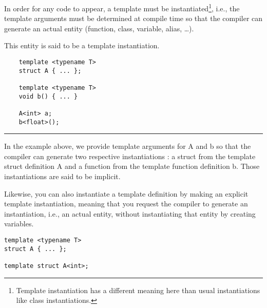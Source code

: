 \begin{paracol}{2}
    
In order for any code to appear, a template must be instantiated\footnote{Template instantiation has a different meaning here than usual instantiations like class instantiations.}, i.e., the template arguments must be determined at compile time so that the compiler can generate an actual entity (function, class, variable, alias, \dots).

\vspace{10pt}

This entity is said to be a template instantiation.

\switchcolumn
\begin{verbatim}
    template <typename T>
    struct A { ... };

    template <typename T>
    void b() { ... }

    A<int> a;
    b<float>();
\end{verbatim}
\end{paracol}

\vspace{10pt}
\hrule
\vspace{10pt}


In the example above, we provide template arguments for A and b so that the compiler can generate two respective instantiations : a struct from the template struct definition A and a function from the template function definition b. Those instantiations are said to be implicit. \\

\begin{paracol}{2}
Likewise, you can also instantiate a template definition by making an explicit template instantiation, meaning that you request the compiler to generate an instantiation, i.e., an actual entity, without instantiating that entity by creating variables. 

\switchcolumn

\begin{verbatim}
template <typename T>
struct A { ... };

template struct A<int>;
\end{verbatim}
\end{paracol}

